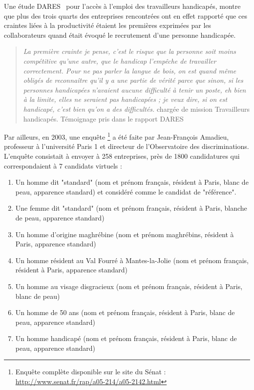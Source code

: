 Une étude DARES~\cite{etudeDares1} pour l'accès à l'emploi des travailleurs handicapés, montre que plus des trois quarts des entreprises rencontrées ont en effet rapporté que ces craintes liées à la productivité étaient les premières exprimées par les collaborateurs quand était évoqué le recrutement d’une personne handicapée.

\begin{quotation}
\textit{La première crainte je pense, c’est le risque que la personne soit moins compétitive qu’une autre, que le handicap l’empêche de travailler correctement. Pour ne pas parler la langue de bois, on est quand même obligés de reconnaître qu’il y a une partie de vérité parce que sinon, si les personnes handicapées n’avaient aucune difficulté à tenir un poste, eh bien à la limite, elles ne seraient pas handicapées ; je veux dire, si on est handicapé, c’est bien qu’on a des difficultés.} chargée de mission Travailleurs handicapés. Témoignage pris dans le rapport DARES~\cite{etudeDares1}\\
\end{quotation}


Par ailleurs, en 2003, une enquête \footnote{Enquête complète disponible sur le site du Sénat : \url{http://www.senat.fr/rap/a05-214/a05-2142.html}} a été faite par Jean-François Amadieu, professeur à l'université Paris 1 et directeur de l'Observatoire des discriminations. L'enquête consistait à envoyer à 258 entreprises, près de 1800 candidatures qui correspondaient à 7 candidats virtuels :
\begin{enumerate}
\item Un homme dit "standard" (nom et prénom français, résident à Paris, blanc de peau, apparence standard) et considéré comme le candidat de "référence".
\item Une femme dit "standard" (nom et prénom français, résident à Paris, blanche de peau, apparence standard)
\item Un homme d'origine maghrébine (nom et prénom maghrébins, résident à Paris, apparence standard)
\item Un homme résident au Val Fourré à Mantes-la-Jolie (nom et prénom français, résident à Paris, apparence standard)
\item Un homme au visage disgracieux (nom et prénom français, résident à Paris, blanc de peau)
\item Un homme de 50 ans (nom et prénom français, résident à Paris, blanc de peau, apparence standard)
\item Un homme handicapé (nom et prénom français, résident à Paris, blanc de peau, apparence standard)
\end{enumerate}

